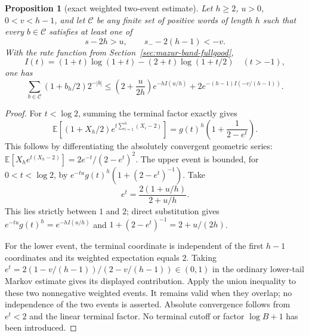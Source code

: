 \documentclass[11pt]{article}
\newtheorem{proposition}{Proposition}
\theoremstyle{remark}\newtheorem{remark}[proposition]{Remark}
\begin{document}
\begin{proposition}[exact weighted two-event estimate]
\label{prop:mazur-weighted-chernoff}
Let $h\ge2$, $u>0$, $0<v<h-1$, and let $\mathcal C$ be any
finite set of positive words of length $h$ such that every $b\in\mathcal C$
satisfies at least one of
\[
 s-2h>u,\qquad s_--2(h-1)<-v .
\]
With the rate function from Section~\ref{sec:mazur-band-fullgood},
\[
 I(t)=(1+t)\log(1+t)-(2+t)\log(1+t/2)\quad(t>-1),
\]
one has
\begin{equation}
 \sum_{b\in\mathcal C}(1+b_h/2)2^{-|b|}
 \le \left(2+\frac{u}{2h}\right)e^{-hI(u/h)}
       +2e^{-(h-1)I(-v/(h-1))}.
 \label{eq:mazur-weighted-chernoff}
\end{equation}
\end{proposition}
\begin{proof}
For $t<\log2$, summing the terminal factor exactly gives
\[
 \mathbb E[(1+X_h/2)e^{t\sum_{i=1}^h(X_i-2)}]
 =g(t)^h\left(1+\frac1{2-e^t}\right).
\]
This follows by differentiating the absolutely convergent geometric
series: $\mathbb E[X_he^{t(X_h-2)}]=2e^{-t}/(2-e^t)^2$.
The upper event is bounded, for $0<t<\log2$, by
$e^{-tu}g(t)^h(1+(2-e^t)^{-1})$.
Take
\[
 e^t=\frac{2(1+u/h)}{2+u/h}.
\]
This lies strictly between $1$ and $2$; direct substitution gives
$e^{-tu}g(t)^h=e^{-hI(u/h)}$ and
$1+(2-e^t)^{-1}=2+u/(2h)$.

For the lower event, the terminal coordinate is independent of the
first $h-1$ coordinates and its weighted expectation equals $2$.
Taking $e^t=2(1-v/(h-1))/(2-v/(h-1))\in(0,1)$ in the ordinary
lower-tail Markov estimate gives its displayed contribution.
Apply the union inequality to these two nonnegative weighted events.
It remains valid when they overlap; no independence of the two events
is asserted. Absolute convergence follows from $e^t<2$ and the
linear terminal factor. No terminal cutoff or factor $\log B+1$
has been introduced.
\end{proof}
\end{document}

